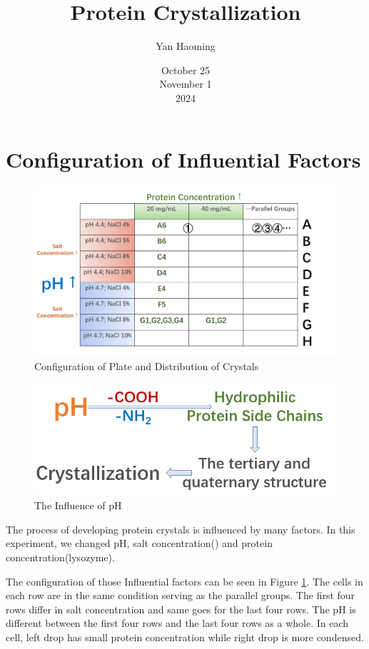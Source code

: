 \documentclass[UTF-8]{article}
\title{Protein Crystallization}
\author{Yan Haoming}
\date{October 25\\November 1\\2024}
\begin{document}
\maketitle

\section{Configuration of Influential Factors}
\begin{figure}
    \centering
    \includegraphics[width=1\linewidth]{../Figures/Configuration of Plate and Crystal Distribution.png}
    \caption{Configuration of Plate and Distribution of Crystals}
    \label{Configuration of Plate and Distribution of Crystals}
\end{figure}
\begin{figure}
    \centering
    \includegraphics[width=1\linewidth]{../Figures/logic.png}
    \caption{The Influence of pH}
    \label{The Influence of pH}
\end{figure}
The process of developing protein crystals is influenced by many factors.
In this experiment, we changed pH, salt concentration() and protein concentration(lysozyme).

The configuration of those Influential factors can be seen in Figure \ref{Configuration of Plate and Distribution of Crystals}.
The cells in each row are in the same condition serving as the parallel groups.
The first four rows differ in salt concentration and same goes for the last four rows.
The pH is different between the first four rows and the last four rows as a whole.
In each cell, left drop has small protein concentration while right drop is more condensed.
\end{document}
